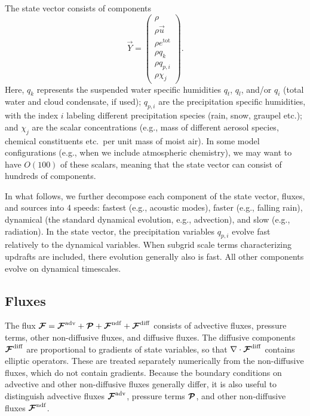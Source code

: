 \documentclass{article}
\begin{document}
The state vector consists of components
\begin{equation}\label{e:state}
\vec{Y}=\left( \begin{array}{c}
\rho \\
\rho\vec{u} \\
\rho e^{\mathrm{tot}}\\
\rho q_k\\
\rho q_{p,i}\\
\rho \chi_j
\end{array}
\right).
\end{equation}
Here, $q_k$ represents the suspended water specific humidities $q_t$, $q_l$, and/or $q_i$ (total water and cloud condensate, if used); $q_{p,i}$ are the precipitation specific humidities, with the index $i$ labeling different precipitation species (rain, snow, graupel etc.); and $\chi_j$ are the scalar concentrations (e.g., mass of different aerosol species, chemical constituents etc.\ per unit mass of moist air). In some model configurations (e.g., when we include atmospheric chemistry), we may want to have $O(100)$ of these scalars, meaning that the state vector can consist of hundreds of components.

In what follows, we further decompose each component of the state vector, fluxes, and sources into 4 speeds: fastest (e.g., acoustic modes), faster (e.g., falling rain), dynamical (the standard dynamical evolution, e.g., advection), and slow (e.g., radiation). In the state vector, the precipitation variables $q_{p,i}$ evolve fast relatively to the dynamical variables. When subgrid scale terms characterizing updrafts are included, there evolution generally also is fast. All other components evolve on dynamical timescales.  

\subsection{Fluxes}

The flux $\boldsymbol{{\mathcal{F}}}=\boldsymbol{{\mathcal{F}}}^{\mathrm{adv}} + \boldsymbol{{\mathcal{P}}} + \boldsymbol{{\mathcal{F}}}^{\mathrm{ndf}} + \boldsymbol{{\mathcal{F}}}^{\mathrm{diff}}$ consists of advective fluxes, pressure terms, other non-diffusive fluxes, and diffusive fluxes. The diffusive components $\boldsymbol{{\mathcal{F}}}^{\mathrm{diff}}$ are proportional to gradients of state variables, so that $\nabla \cdot \boldsymbol{{\mathcal{F}}}^{\mathrm{diff}}$ contains elliptic operators. These are treated separately numerically from the non-diffusive fluxes, which do not contain gradients. Because the boundary conditions on advective and other non-diffusive fluxes generally differ, it is also useful to distinguish advective fluxes $\boldsymbol{{\mathcal{F}}}^{\mathrm{adv}}$, pressure terms $\boldsymbol{{\mathcal{P}}}$, and other non-diffusive fluxes $\boldsymbol{{\mathcal{F}}}^{\mathrm{ndf}}$. 
\end{document}
